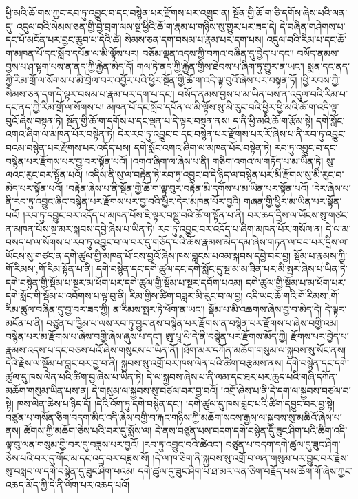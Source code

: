 ཕྱི་མའི་ཆོ་གས་ཀྱང་རབ་ཏུ་འབྱུང་བ་དང་བསྙེན་པར་རྫོགས་པར་འགྲུབ་ན། སྔོན་གྱི་ཆོ་ག་ཅི་དགོས་ཞེས་པའི་ལན་དུ། འདུལ་བའི་སེམས་ཅན་གྱི་བྱེ་བྲག་ལས་སྔ་ཕྱིའི་ཆོ་ག་རྣམ་པ་གཉིས་སུ་གྱུར་པར་ཟད་དེ། དེ་བཞིན་གཤེགས་པ་དང་པོ་མངོན་པར་བྱང་ཆུབ་པ་དེའི་ཚེ། སེམས་ཅན་དག་བསམ་པ་རྣམ་པར་དག་པས། འདུལ་བའི་རིམ་པ་དང་ཆོ་ག་མཁན་པོ་དང་སློབ་དཔོན་ལ་མི་ལྟོས་པར། བཅོམ་ལྡན་འདས་ཀྱི་བཀའ་བཞིན་དུ་བྱེད་པ་དང་། བསོད་ནམས་བྱས་པ་ཤ་སྟག་པས་ན་ནད་ཀྱི་རྐྱེན་མེད་དོ། གལ་ཏེ་ནད་ཀྱི་རྐྱེན་གྱིས་ཐེབས་པ་ཞིག་ཏུ་གྱུར་ན་ཡང་། སྨན་དང་ནད་ཀྱི་རིམ་གྲོ་ལ་སོགས་པ་མི་བྲེལ་བར་འབྱོར་པའི་ཕྱིར་སྔོན་གྱི་ཆོ་ག་འདི་ལྟ་བུའོ་ཞེས་པར་བསྟན་ཏོ། །ཕྱི་རབས་ཀྱི་སེམས་ཅན་དག་དེ་ལྟར་བསམ་པ་རྣམ་པར་དག་པ་དང་། བསོད་ནམས་བྱས་པ་མ་ཡིན་པས་ན་འདུལ་བའི་རིམ་པ་དང་ནད་ཀྱི་རིམ་གྲོ་ལ་སོགས་པ། མཁན་པོ་དང་སློབ་དཔོན་ལ་མི་ལྟོས་སུ་མི་རུང་བའི་ཕྱིར་ཕྱི་མའི་ཆོ་ག་འདི་ལྟ་བུའོ་ཞེས་བསྟན་ཏེ། སྔོན་གྱི་ཆོ་ག་དགོས་པ་དང་ལྡན་པ་དེ་ལྟར་བསྟན་ནས། ད་ནི་ཕྱི་མའི་ཆོ་ག་རྩོམ་སྟེ། དགེ་སློང་འགའ་ཞིག་ལ་མཁན་པོར་བསྟེན་ཏེ། དེར་རབ་ཏུ་འབྱུང་བ་དང་བསྙེན་པར་རྫོགས་པར་རོ་ཞེས་པ་ནི་རབ་ཏུ་འབྱུང་བའམ་བསྙེན་པར་རྫོགས་པར་འདོད་པས། དགེ་སློང་འགའ་ཞིག་ལ་མཁན་པོར་བསྟེན་ཏེ། རབ་ཏུ་འབྱུང་བ་དང་བསྙེན་པར་རྫོགས་པར་བྱ་བར་སྟོན་པའོ། །འགའ་ཞིག་ལ་ཞེས་པ་ནི། གཅིག་འགའ་ལ་གཏོད་པ་མ་ཡིན་ཏེ། སུ་ལའང་རུང་བར་སྟོན་པའོ། །འདིས་ནི་སུ་ལ་བརྟེན་ཏེ་རབ་ཏུ་འབྱུང་བ་དེ་ཉིད་ལ་བསྙེན་པར་མི་རྫོགས་སུ་མི་རུང་བ་མེད་པར་སྟོན་པའོ། །བརྟེན་ཞེས་པ་ནི་སྔོན་གྱི་ཆོ་ག་ལྟ་བུར་བརྟེན་མི་དགོས་པ་མ་ཡིན་པར་སྟོན་པའོ། །དེར་ཞེས་པ་ནི་རབ་ཏུ་འབྱུང་ཞིང་བསྙེན་པར་རྫོགས་པར་བྱ་བའི་ཕྱིར་དེར་མཁན་པོར་བྱའི། གཞན་གྱི་ཕྱིར་མ་ཡིན་པར་སྟོན་པའོ། །རབ་ཏུ་དབྱུང་བར་འདོད་པ་མཁན་པོས་ཇི་ལྟར་བསྡུ་བའི་ཆོ་ག་སྟོན་པ་ནི། བར་ཆད་དྲིས་ལ་ཡོངས་སུ་གཙང་ན་མཁན་པོས་སྔ་མར་སྐབས་དབྱེ་ཞེས་པ་ཡིན་ཏེ། རབ་ཏུ་འབྱུང་བར་འདོད་པ་ཞིག་མཁན་པོར་གསོལ་ན། དེ་ལ་མ་བསད་པ་ལ་སོགས་པ་རབ་ཏུ་འབྱུང་བ་ལ་བར་དུ་གཅོད་པའི་ཆོས་རྣམས་མེད་དམ་ཞེས་གཏན་ལ་བབ་པར་དྲིས་ལ་ཡོངས་སུ་གཙང་ན་དགེ་ཚུལ་གྱི་མཁན་པོ་ངས་བྱའོ་ཞེས་ཁས་བླངས་པའམ་སྐབས་དབྱེ་བར་བྱ། སྡོམ་པ་རྣམས་ཀྱི་{གོ་རིམས་,གོ་རིམ་}སྟོན་པ་ནི། དགེ་བསྙེན་དང་དགེ་ཚུལ་དང་དགེ་སློང་དུ་སྔ་མ་མ་ཟིན་པར་མི་སྤར་ཞེས་པ་ཡིན་ཏེ་དགེ་བསྙེན་གྱི་སྡོམ་པ་སྔར་མ་ཕོག་པར་དགེ་ཚུལ་གྱི་སྡོམ་པ་སྔར་དབོག་པའམ། དགེ་ཚུལ་གྱི་སྡོམ་པ་མ་ཕོག་པར་དགེ་སློང་གི་སྡོམ་པ་འབོགས་པ་ལྟ་བུ་ནི། རིམ་གྱིས་ཚིག་བཟླར་མི་རུང་བ་ལ་བྱ། འདི་ཡང་ཆོ་གའི་{གོ་རིམས་,གོ་རིམ་}ཚུལ་བཞིན་དུ་བྱ་བར་ཟད་ཀྱི། ན་རིམས་སྤར་ཏེ་ཕོག་ན་ཡང་། སྡོམ་པ་མི་འཆགས་ཞེས་བྱ་བ་མེད་དེ། དེ་ལྟར་མངོན་པ་ནི། བཙུན་པ་ཁྱིམ་པ་ལས་རབ་ཏུ་བྱུང་ནས་བསྙེན་པར་རྫོགས་ན་བསྙེན་པར་རྫོགས་པ་ཞེས་བགྱི་འམ། བསྙེན་པར་མ་རྫོགས་པ་ཞེས་བགྱི་ཞེས་ཞུས་པ་དང་། ཨུ་པཱ་ལི་དེ་ནི་བསྙེན་པར་རྫོགས་མོད་ཀྱི། རྫོགས་པར་བྱེད་པ་རྣམས་འདས་པ་དང་བཅས་པའོ་ཞེས་གསུངས་པ་ཡིན་ནོ། །ཐོག་མར་དཀོན་མཆོག་གསུམ་ལ་སྐྱབས་སུ་སོང་ནས། དེའི་རྗེས་ལ་སྡོམ་པ་བླང་བར་བྱ་བ་ནི། སྐྱབས་སུ་འགྲོ་བར་ཁས་ལེན་པའི་ཚིག་བརྩམས་ནས། དགེ་བསྙེན་དང་དགེ་ཚུལ་དུ་ཁས་ལེན་པའི་ཚིག་བྱ་ཞེས་པ་ཡིན་ཏེ། དེ་ལ་སྐྱབས་ཞེས་པ་ནི་ལམ་དང་ཐར་པར་ཆུད་པའི་གཞི་དཀོན་མཆོག་གསུམ་ཡིན་པས་ན། དེ་གསུམ་ལ་སྐྱབས་སུ་བཙལ་བར་བྱ་བའོ། །འགྲོ་ཞེས་པ་ནི་དེ་དག་ལ་སྐྱབས་བཙལ་བ་སྟེ། ཁས་ལེན་ཆེས་པ་ཉིད་དོ། །དེའི་འོག་ཏུ་དགེ་བསྙེན་དང་། །དགེ་ཚུལ་དུ་ཁས་བླང་པའི་ཚིག་དབྱུང་བར་བྱ་སྟེ། བཙུན་པ་གསོན་ཅིག་བདག་མིང་འདི་ཞེས་བགྱི་བ་རྐང་གཉིས་ཀྱི་མཆོག་སངས་རྒྱས་ལ་སྐྱབས་སུ་མཆིའོ་ཞེས་པ་ནས། ཚོགས་ཀྱི་མཆོག་ཅེས་པའི་བར་དུ་སྨོས་ལ། དེ་ནས་བཙུན་པས་བདག་དགེ་བསྙེན་དུ་ཟུང་ཤིག་པའི་ཚིག་འདི་ལྟ་བུ་ལན་གསུམ་གྱི་བར་དུ་བཟླས་པར་བྱའོ། །རབ་ཏུ་འབྱུང་བའི་ཚེའང་། བཙུན་པ་བདག་དགེ་ཚུལ་དུ་ཟུང་ཤིག་ཅེས་པའི་བར་དུ་གོང་མ་དང་འདྲ་བར་བཟླས་སོ། །དེ་ལ་ཁ་ཅིག་ནི་སྐྱབས་སུ་འགྲོ་བ་ལན་གསུམ་པར་བྱུང་བར་རྗེས་སུ་བསླབ་ལ་དགེ་བསྙེན་དུ་ཟུང་ཤིག་པའམ། དགེ་ཚུལ་དུ་ཟུང་ཤིག་པ་ཐ་མར་ལན་ཅིག་བརྗོད་པས་ཆོག་གོ་ཞེས་ཀྱང་འཆད་མོད་ཀྱི་དེ་ནི་ལོག་པར་འཆད་པའོ། 